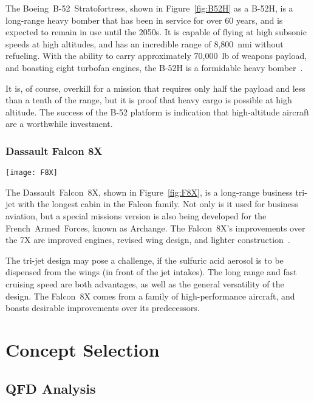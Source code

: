 \documentclass[12pt]{article}
\begin{document}
The Boeing~B-52~Stratofortress, shown in Figure~\ref{fig:B52H} as a B-52H, is a long-range heavy bomber that has been in service for over 60 years, and is expected to remain in use until the 2050s.
It is capable of flying at high subsonic speeds at high altitudes, and has an incredible range of 8,800~nmi without refueling.
With the ability to carry approximately 70,000~lb of weapons payload, and boasting eight turbofan engines, the B-52H is a formidable heavy bomber~\cite{Force:2019aa}.

It is, of course, overkill for a mission that requires only half the payload and less than a tenth of the range, but it is proof that heavy cargo is possible at high altitude.
The success of the B-52 platform is indication that high-altitude aircraft are a worthwhile investment.


\subsubsection{Dassault Falcon 8X}
\begin{SCfigure}[0.8][h]
	\centering
	\texttt{[image: F8X]}
	\caption{Dassault Falcon 8X at Paris Air Show 2019~\cite{pic:F8X}}
	\label{fig:F8X}
\end{SCfigure}

The Dassault~Falcon~8X, shown in Figure~\ref{fig:F8X}, is a long-range business tri-jet with the longest cabin in the Falcon family.
Not only is it used for business aviation, but a special missions version is also being developed for the French~Armed~Forces, known as Archange.
The Falcon~8X's improvements over the 7X are improved engines, revised wing design, and lighter construction~\cite{Janes:2023aa}.

The tri-jet design may pose a challenge, if the sulfuric acid aerosol is to be dispensed from the wings (in front of the jet intakes).
The long range and fast cruising speed are both advantages, as well as the general versatility of the design.
The Falcon~8X comes from a family of high-performance aircraft, and boasts desirable improvements over its predecessors.


\section{Concept Selection}
\subsection{QFD Analysis}
\end{document}
